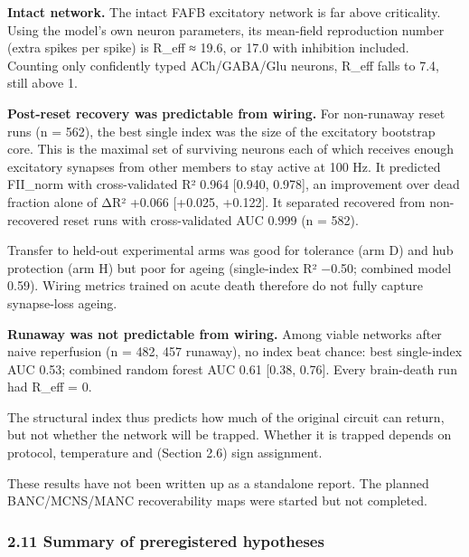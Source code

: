 \documentclass[11pt]{article}
\begin{document}
\textbf{Intact network.} The intact FAFB excitatory network is far above criticality. Using the model's own neuron parameters, its mean-field reproduction number (extra spikes per spike) is R\_eff ≈ 19.6, or 17.0 with inhibition included. Counting only confidently typed ACh/GABA/Glu neurons, R\_eff falls to 7.4, still above 1.

\textbf{Post-reset recovery was predictable from wiring.} For non-runaway reset runs (n = 562), the best single index was the size of the excitatory bootstrap core. This is the maximal set of surviving neurons each of which receives enough excitatory synapses from other members to stay active at 100 Hz. It predicted FII\_norm with cross-validated R² 0.964 {[}0.940, 0.978{]}, an improvement over dead fraction alone of ΔR² +0.066 {[}+0.025, +0.122{]}. It separated recovered from non-recovered reset runs with cross-validated AUC 0.999 (n = 582).

Transfer to held-out experimental arms was good for tolerance (arm D) and hub protection (arm H) but poor for ageing (single-index R² −0.50; combined model 0.59). Wiring metrics trained on acute death therefore do not fully capture synapse-loss ageing.

\textbf{Runaway was not predictable from wiring.} Among viable networks after naive reperfusion (n = 482, 457 runaway), no index beat chance: best single-index AUC 0.53; combined random forest AUC 0.61 {[}0.38, 0.76{]}. Every brain-death run had R\_eff = 0.

The structural index thus predicts how much of the original circuit can return, but not whether the network will be trapped. Whether it is trapped depends on protocol, temperature and (Section 2.6) sign assignment.

These results have not been written up as a standalone report. The planned BANC/MCNS/MANC recoverability maps were started but not completed.

\subsubsection{2.11 Summary of preregistered hypotheses}\label{summary-of-preregistered-hypotheses}
\end{document}
